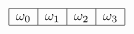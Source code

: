 \documentclass[preview]{standalone}
\begin{document}
$$\begin{array}{|c|c|c|c|}
	\hline
	\omega_0 & \omega_1 & \omega_2 & \omega_3\\
	\hline
\end{array} $$
\end{document}
